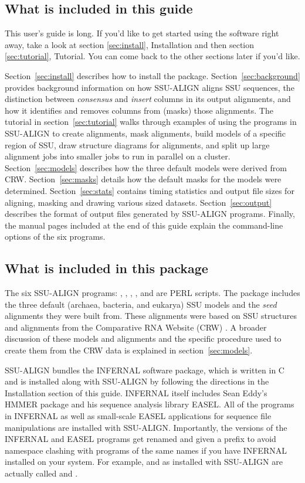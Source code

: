 \subsection{What is included in this guide}

This user's guide is long. If you'd like to get started using the
software right away, take a look at section \ref{sec:install},
Installation and then section \ref{sec:tutorial}, Tutorial. You
can come back to the other sections later if you'd like.

Section~\ref{sec:install} describes how to install the
package. Section~\ref{sec:background} provides background information
on how SSU-ALIGN aligns SSU sequences, the distinction between
\emph{consensus} and \emph{insert} columns in its output alignments,
and how it identifies and removes columns from (masks) those
alignments.  The tutorial in section~\ref{sec:tutorial} walks through
examples of using the programs in SSU-ALIGN to create
alignments, mask alignments, build models of a specific region of SSU,
draw structure diagrams for alignments, and split up large alignment
jobs into smaller jobs to run in parallel on a cluster.
Section~\ref{sec:models} describes how the three default models were
derived from CRW. Section~\ref{sec:masks} details how the
default masks for the models were determined. 
Section~\ref{sec:stats} contains timing statistics and output file
sizes for aligning, masking and drawing various sized datasets.
Section~\ref{sec:output} describes the
format of output files generated by SSU-ALIGN programs.
Finally, the manual pages included at the end
of this guide explain the command-line options of the six programs.

\subsection{What is included in this package}

The six SSU-ALIGN programs: , ,
, ,  and 
are PERL scripts.  The package includes the three default (archaea,
bacteria, and eukarya) SSU models and the \emph{seed} alignments they
were built from. These alignments were based on SSU structures and
alignments from the Comparative RNA Website (CRW)
\cite{CannoneGutell02}. A broader discussion of these models and
alignments and the specific procedure used to create them from the CRW
data is explained in section~\ref{sec:models}.

SSU-ALIGN bundles the INFERNAL software package, which is
written in C and is installed along with SSU-ALIGN by following
the directions in the Installation section of this
guide. INFERNAL itself includes Sean Eddy's HMMER package
and his sequence analysis library EASEL. All of the programs in
INFERNAL as well as small-scale EASEL applications for sequence
file manipulations are installed with SSU-ALIGN. Importantly, the
versions of the INFERNAL and EASEL programs get renamed and given a
 prefix to avoid namespace clashing with programs of the
same names if you have INFERNAL installed on your system. For example,
 and  as installed with SSU-ALIGN are
actually called  and .

